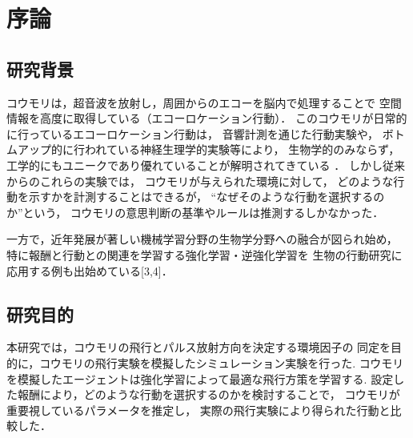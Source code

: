 \documentclass[main]{subfiles}
\begin{document}
\newpage
\chapter{序論}

\section{研究背景}
コウモリは，超音波を放射し，周囲からのエコーを脳内で処理することで
空間情報を高度に取得している（エコーロケーション行動）．
このコウモリが日常的に行っているエコーロケーション行動は，
音響計測を通じた行動実験や，
ボトムアップ的に行われている神経生理学的実験等により，
生物学的のみならず，
工学的にもユニークであり優れていることが解明されてきている
\cite{ref:simulating_bout}\cite{ref:can_ai}．
しかし従来からのこれらの実験では，
コウモリが与えられた環境に対して，
どのような行動を示すかを計測することはできるが，
“なぜそのような行動を選択するのか”という，
コウモリの意思判断の基準やルールは推測するしかなかった．

一方で，近年発展が著しい機械学習分野の生物学分野への融合が図られ始め，
特に報酬と行動との関連を学習する強化学習・逆強化学習を
生物の行動研究に応用する例も出始めている[3,4]．

\section{研究目的}
本研究では，コウモリの飛行とパルス放射方向を決定する環境因子の
同定を目的に，コウモリの飛行実験を模擬したシミュレーション実験を行った.
コウモリを模擬したエージェントは強化学習によって最適な飛行方策を学習する.
設定した報酬により，どのような行動を選択するのかを検討することで，
コウモリが重要視しているパラメータを推定し，
実際の飛行実験により得られた行動と比較した．
\end{document}
